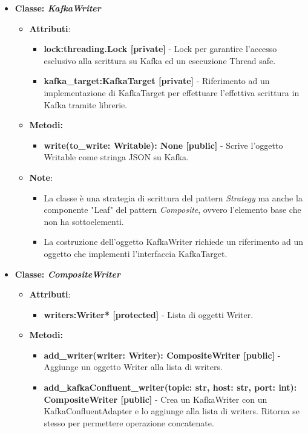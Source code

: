 \begin{itemize}
\begin{itemize}
    \end{itemize}
    \item{\textbf{Classe: \textit{KafkaWriter}}}
    \begin{itemize}
    \item\textbf{Attributi}:
        \begin{itemize}
        \item \textbf{lock:threading.Lock [private]} - Lock per garantire l'accesso esclusivo alla scrittura su Kafka ed un esecuzione Thread safe.
        \item \textbf{kafka\_target:KafkaTarget [private]} - Riferimento ad un implementazione di KafkaTarget per effettuare l'effettiva scrittura in Kafka tramite librerie.
    \end{itemize}
    \item \textbf{Metodi: }
    \begin{itemize}
        \item \textbf{write(to\_write: Writable): None [public]} - Scrive l'oggetto Writable come stringa JSON su Kafka.
    \end{itemize}
    \item\textbf{Note}:
        \begin{itemize}
            \item La classe è una strategia di scrittura del pattern \textit{Strategy} ma anche la componente "Leaf" del pattern \textit{Composite}, ovvero l'elemento base che non ha sottoelementi.
            \item La costruzione dell'oggetto KafkaWriter richiede un riferimento ad un oggetto che implementi l'interfaccia KafkaTarget.
        \end{itemize}
    \end{itemize}
    \item{\textbf{Classe: \textit{CompositeWriter}}}
    \begin{itemize}
    \item\textbf{Attributi}:
        \begin{itemize}
        \item \textbf{writers:Writer* [protected]} - Lista di oggetti Writer.
    \end{itemize}
    \item \textbf{Metodi: }
    \begin{itemize}
        \item \textbf{add\_writer(writer: Writer): CompositeWriter [public]} - Aggiunge un oggetto Writer alla lista di writers.
        \item \textbf{add\_kafkaConfluent\_writer(topic: str, host: str, port: int): CompositeWriter [public]} - Crea un KafkaWriter con un KafkaConfluentAdapter e lo aggiunge alla lista di writers. Ritorna se stesso per permettere operazione concatenate.

\end{itemize}
\end{itemize}
\end{itemize}
